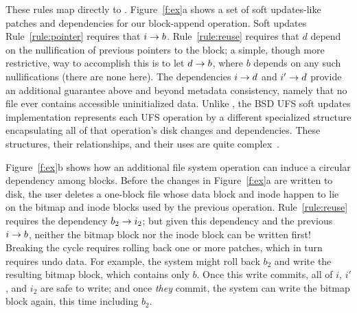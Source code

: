 These rules map directly to \Featherstitch.
%
Figure~\ref{f:ex}a shows a set of soft updates-like patches and dependencies for
 our block-append operation.
%
%
%
%
Soft updates Rule~\ref{rule:pointer} requires that $i \rightarrow b$.
%
Rule~\ref{rule:reuse} requires that $d$ depend on the nullification of previous pointers to the
 block;
%
a simple, though more restrictive, way to accomplish this is to let $d
 \rightarrow b$, where $b$ depends on any such nullifications
 (there are none here).
%
The dependencies $i \rightarrow d$ and $i' \rightarrow d$ provide an
 additional guarantee above and beyond metadata consistency, namely
 that no file ever contains accessible uninitialized data.
%
%
Unlike \Featherstitch, the BSD UFS soft updates implementation represents each UFS
 operation by a different specialized structure encapsulating
 all of that operation's disk changes and dependencies.
These structures, their
relationships, and their uses %
are quite complex~\cite{mckusick99soft}.

\begin{comment}
\begin{figure}[htb]
  \centering
  \texttt{[image: fig/examplesb\_3]}
  \caption{\label{fig:softupdate} Soft updates \patches\
  for appending one block to an empty file in an FFS-like file system.}
\end{figure}
\end{comment}

Figure~\ref{f:ex}b shows how an additional file system operation can induce
 a circular dependency among blocks.
%
Before the changes in Figure~\ref{f:ex}a are written to disk, the user deletes a
 one-block file whose data block and inode happen to lie on the bitmap
 and inode blocks used by the previous operation.
%
Rule~\ref{rule:reuse} requires the dependency $b_2 \rightarrow i_2$; but
 given this dependency and the previous $i \rightarrow b$, neither the bitmap
 block nor the inode block can be written first!
%
Breaking the cycle requires rolling back one or more patches, which in turn
 requires undo data.
%
For example, the system might roll back $b_2$ and write the resulting
 bitmap block, which contains only
 $b$.  Once this write commits, all of $i$, $i'$, and
 $i_2$ are safe to write; and once \emph{they} commit, the system can write
 the bitmap block again, this time including $b_2$.


